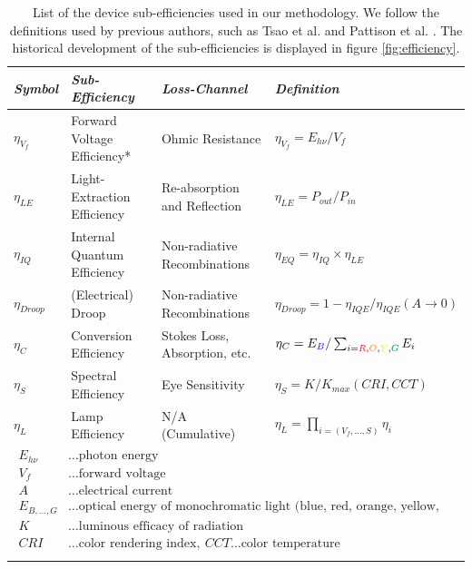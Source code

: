 \documentclass[a4paper,nocompress]{spie}  %
\begin{document}
    \begin{table}[h!]
        \caption{List of the device sub-efficiencies used in our methodology. We follow the definitions used by previous authors, such as Tsao et al. \cite{tsao2010solid} and Pattison et al. \cite{pattison2017solid}. The historical development of the sub-efficiencies is displayed in figure \ref{fig:efficiency}.}
        \bigskip
        \centering
    	\begin{tabularx}{\textwidth}{|l|l|l|X|}
    		\hline
    			\textit{Symbol} & \textit{Sub-Efficiency} & \textit{Loss-Channel} & \textit{Definition} \\
    		\hline
    		    $\eta_{V_f}$ & Forward Voltage Efficiency* & Ohmic Resistance & $\eta_{V_f} = E_{h\nu} / V_f $ \\
    		\hline
    		    $\eta_{LE}$ & Light-Extraction Efficiency & Re-absorption and Reflection & $\eta_{LE}= P_{out} / P_{in} $ \\
    		\hline
    		    $\eta_{IQ}$ & Internal Quantum Efficiency & Non-radiative Recombinations & $\eta_{EQ} = \eta_{IQ} \times \eta_{LE}$ \\
    		\hline
    		    $\eta_{Droop}$ & (Electrical) Droop & Non-radiative Recombinations & $\eta_{Droop} = 1 - \eta_{IQE} / \eta_{IQE}(A \rightarrow 0) $ \\
    		\hline
    		    $\eta_C$ & Conversion Efficiency & Stokes Loss, Absorption, etc. & $\eta_{C} = E_{\textcolor{blue}{B}} / \sum_{i=\textcolor{red}{R},\textcolor{orange}{O},\textcolor{yellow}{Y},\textcolor{teal}{G}} E_i$ \\
    		\hline
    		    $\eta_{S}$ & Spectral Efficiency & Eye Sensitivity & $\eta_{S} = K / K_{max}(CRI,CCT)$ \\
    		\hline
    		    $\eta_L$ & Lamp Efficiency & N/A (Cumulative) & $\eta_L = \prod_{i=(V_f,\dots,S)} \eta_i$ \\
            \hline
                \multicolumn{4}{|l|}{$\!\begin{aligned}
                    E_{h\nu} &\dots \text{photon energy} \\
                    V_f &\dots \text{forward voltage} \\
                    A &\dots \text{electrical current} \\
                    E_{B,\dots,G} &\dots \text{optical energy of monochromatic light (blue, red, orange, yellow, green)} \\
                    K &\dots \text{luminous efficacy of radiation} \\
                    CRI &\dots \text{color rendering index}, \ CCT \dots \text{color temperature} \\
                \end{aligned}$} \\
            \hline
    	\end{tabularx}
    	\label{tab:eff}
    \end{table}
        
\end{document}
